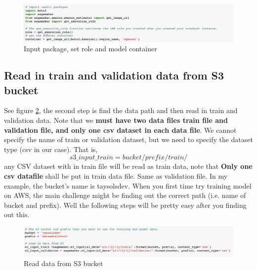 \documentclass[12pt]{article}
\begin{document}
\begin{figure}[H]
\centering
\begin{minipage}{1\textwidth}
  \centering
  \includegraphics[width=1\linewidth]{set_role_container.png}
   \caption{Input package, set role and model container}
   \label{fig:set_role_container}
\end{minipage}%
\end{figure}

\subsection{Read in train and validation data from S3 bucket}
See figure \ref{fig:set_data_path}, the second step is find the data path and then read in train and validation data. Note that we \textbf{must have two data files train file and validation file, and only one csv dataset in each data file}. We cannot specify the name of train or validation dataset, but we need to specify the dataset type (csv in our case). That is,
$$s3\_input\_train = bucket/prefix/train/$$ any CSV dataset with in train file will be read as train data, note that \textbf{Only one csv datafile} shall be put in train data file. Same as validation file. In my example, the bucket's name is taysolsdev. When you first time try training model on AWS, the main challenge might be finding out the correct path (i.e. name of bucket and prefix). Well the following steps will be pretty easy after you finding out this.

\begin{figure}[H]
\centering
\begin{minipage}{1\textwidth}
  \centering
  \includegraphics[width=1\linewidth]{set_data_path.png}
   \caption{Read data from S3 bucket}
   \label{fig:set_data_path}
\end{minipage}%
\end{figure}
\end{document}
